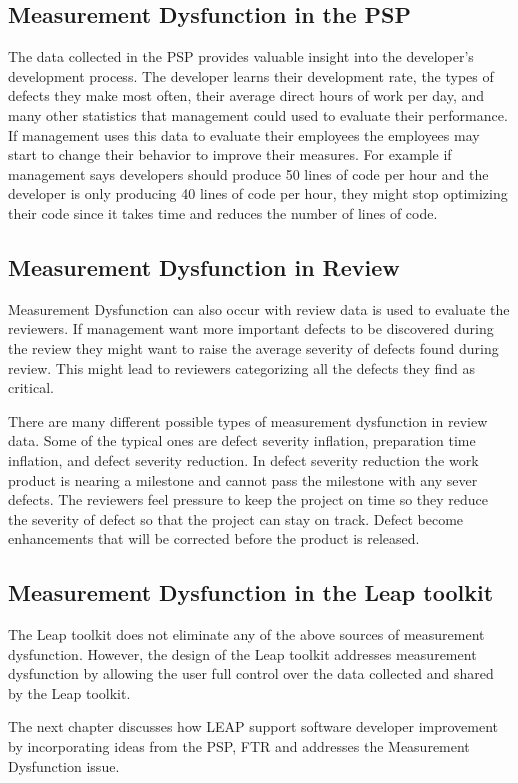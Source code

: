 \subsection{Measurement Dysfunction in the PSP}

The data collected in the PSP provides valuable insight into the developer's
development process.  The developer learns their development rate, the types of
defects they make most often, their average direct hours of work per day, and
many other statistics that management could used to evaluate their
performance.  If management uses this data to evaluate their employees the
employees may start to change their behavior to improve their measures.  For
example if management says developers should produce 50 lines of code per hour
and the developer is only producing 40 lines of code per hour, they might
stop optimizing their code since it takes time and reduces the number of lines
of code.

\subsection{Measurement Dysfunction in Review}

Measurement Dysfunction can also occur with review data is used to evaluate the 
reviewers.  If management want more important defects to be discovered during
the review they might want to raise the average severity of defects found
during review.  This might lead to reviewers categorizing all the defects they
find as critical. 

There are many different possible types of measurement dysfunction in review
data.  Some of the typical ones are defect severity inflation, preparation time 
inflation, and defect severity reduction.  In defect severity reduction the
work product is nearing a milestone and cannot pass the milestone with any sever 
defects.  The reviewers feel pressure to keep the project on time so they
reduce the severity of defect so that the project can stay on track.  Defect
become enhancements that will be corrected before the product is released.

\subsection{Measurement Dysfunction in the Leap toolkit}

The Leap toolkit does not eliminate any of the above sources of measurement
dysfunction. However, the design of the Leap toolkit addresses measurement
dysfunction by allowing the user full control over the data collected and
shared by the Leap toolkit.

The next chapter discusses how LEAP support software developer improvement by
incorporating ideas from the PSP, FTR and addresses the Measurement Dysfunction 
issue.




